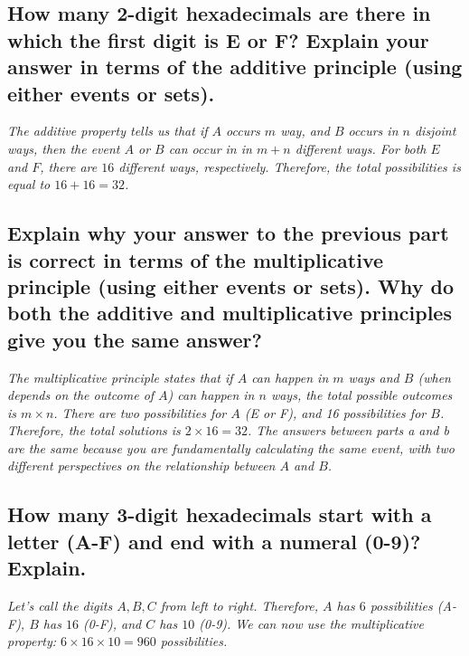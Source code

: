\documentclass{article}
\begin{document}
\subsection{How many 2-digit hexadecimals are there in which the first digit is E or F?
    Explain your answer in terms of the additive principle (using either events or sets).}
\hspace{1cm}\textit{The additive property tells us that if $A$ occurs $m$ way, and $B$
    occurs in $n$ disjoint ways, then the event $A$ or $B$ can occur in in $m+n$ different ways.
    For both $E$ and $F$, there are $16$ different ways, respectively. Therefore, the total
possibilities is equal to $16+16=32$.}
\subsection{Explain why your answer to the previous part is correct in terms of the
    multiplicative principle (using either events or sets).
    Why do both the additive and multiplicative principles give you the same answer?}
\hspace{1cm}\textit{The multiplicative principle states that if $A$ can happen in $m$ ways and $B$
    (when depends on the outcome of $A$) can happen in $n$ ways, the total possible outcomes is
    $m\times n$. There are two possibilities for $A$ (E or F), and 16 possibilities for $B$. Therefore,
    the total solutions is $2\times 16 = 32$. The answers between parts a and b are the same because
    you are fundamentally calculating the same event, with two different perspectives on the
    relationship between $A$ and $B$.}
\subsection{How many 3-digit hexadecimals start with a letter (A-F) and end with a numeral (0-9)? Explain.}
\hspace{1cm}\textit{Let's call the digits $A,B,C$ from left to right. Therefore, $A$ has $6$ possibilities (A-F),
    $B$ has $16$ (0-F), and $C$ has $10$ (0-9). We can now use the multiplicative property: 
    $6\times 16\times 10 = 960$ possibilities.}
\clearpage
\end{document}
